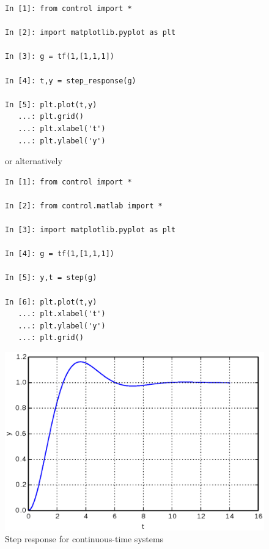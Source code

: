 \begin{figure}[htbp]	%
\begin{minipage}[t]{0.55\textwidth}
  \vspace{0pt}
\begin{lstlisting}[linewidth=7cm, xleftmargin=0cm]
In [1]: from control import *

In [2]: import matplotlib.pyplot as plt

In [3]: g = tf(1,[1,1,1])

In [4]: t,y = step_response(g)

In [5]: plt.plot(t,y)
   ...: plt.grid()
   ...: plt.xlabel('t')
   ...: plt.ylabel('y')

\end{lstlisting}

or alternatively

\begin{lstlisting}[linewidth=7cm,xleftmargin=0cm]
In [1]: from control import *

In [2]: from control.matlab import *

In [3]: import matplotlib.pyplot as plt

In [4]: g = tf(1,[1,1,1])

In [5]: y,t = step(g)

In [6]: plt.plot(t,y)
   ...: plt.xlabel('t')
   ...: plt.ylabel('y')
   ...: plt.grid()
\end{lstlisting}
\end{minipage}%
\begin{minipage}[t]{0.45\textwidth}
  \centering
  \vspace{0.2cm}
  \includegraphics[width=\textwidth]{eps/stepresp.eps}
\end{minipage}
\caption{Step response for continuous-time systems}
\label{F1}
\end{figure}

